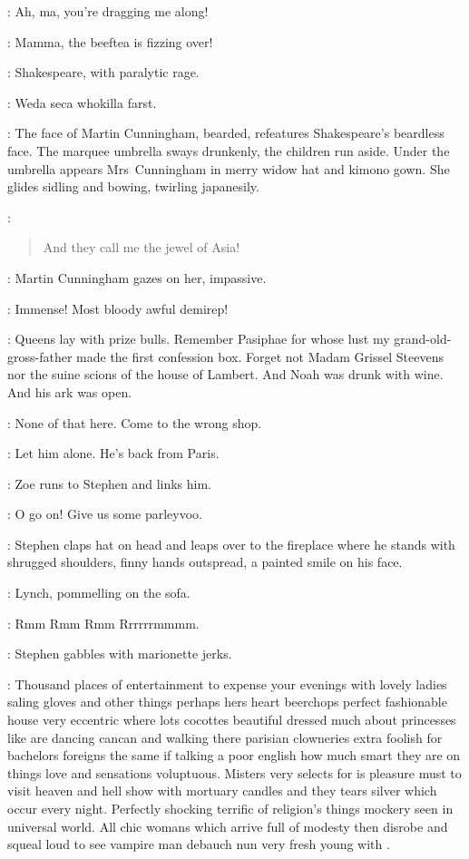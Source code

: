 \Freddy[1]:
Ah, ma, you're dragging me along!

\Susy[2]:
Mamma, the beeftea is fizzing over!

:
Shakespeare, with paralytic rage.

\Shakespeare:
Weda seca whokilla farst.

:
The face of Martin Cunningham, bearded,
refeatures Shakespeare's beardless face.
The marquee umbrella sways drunkenly, the children run aside.
Under the umbrella appears Mrs~Cunningham in merry widow hat and kimono gown.
She glides sidling and bowing, twirling japanesily.

\MrsCunningham:
\begin{verse}
    And they call me the jewel of Asia!
\end{verse}

:
Martin Cunningham gazes on her, impassive.

\MartinCunningham:
Immense!
Most bloody awful demirep!


\Stephen:
Queens lay with prize bulls.
Remember Pasiphae for whose lust my grand-old-gross-father made the first confession box.
Forget not Madam Grissel Steevens nor the suine scions of the house of Lambert.
And Noah was drunk with wine.
And his ark was open.

\Bella:
None of that here.
Come to the wrong shop.

\Lynch:
Let him alone.
He's back from Paris.

:
Zoe runs to Stephen and links him.

\Zoe:
O go on!
Give us some parleyvoo.

:
Stephen claps hat on head and leaps over to the fireplace
where he stands with shrugged shoulders, finny hands outspread,
a painted smile on his face.

:
Lynch, pommelling on the sofa.

\Lynch:
Rmm Rmm Rmm Rrrrrrmmmm.

:
Stephen gabbles with marionette jerks.

\Stephen:
Thousand places of entertainment to expense your evenings
with lovely ladies saling gloves and other things
perhaps hers heart beerchops perfect fashionable house
very eccentric where lots cocottes beautiful dressed much about princesses
like are dancing cancan and walking there parisian clowneries
extra foolish for bachelors foreigns the same if talking a poor english
how much smart they are on things love and sensations voluptuous.
Misters very selects for is pleasure must to visit heaven and hell show
with mortuary candles and they tears silver which occur every night.
Perfectly shocking terrific of religion's things mockery seen in universal world.
All chic womans which arrive full of modesty then disrobe and squeal loud
to see vampire man debauch nun very fresh young with .


